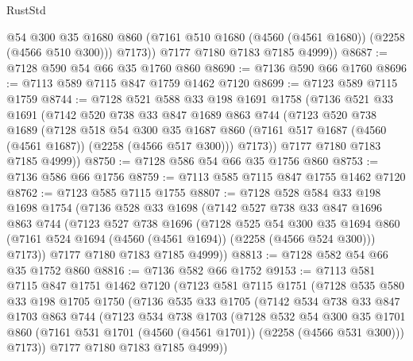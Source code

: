 \begin{lexlean}{RustStd}
\begin{coremodule}
            @54
            @300
            @35
            @1680
            @860
            (@7161 @510 @1680 (@4560 (@4561 @1680)) (@2258 (@4566 @510 @300)))
            @7173))
        @7177
        @7180
        @7183
        @7185
        @4999))
@8687 := @7128 @590 @54 @66 @35 @1760 @860
@8690 := @7136 @590 @66 @1760
@8696 := @7113 @589 @7115 @847 @1759 @1462 @7120
@8699 := @7123 @589 @7115 @1759
@8744 := @7128
    @521
    @588
    @33
    @198
    @1691
    @1758
    (@7136
      @521
      @33
      @1691
      (@7142
        @520
        @738
        @33
        @847
        @1689
        @863
        @744
        (@7123
          @520
          @738
          @1689
          (@7128
            @518
            @54
            @300
            @35
            @1687
            @860
            (@7161 @517 @1687 (@4560 (@4561 @1687)) (@2258 (@4566 @517 @300)))
            @7173))
        @7177
        @7180
        @7183
        @7185
        @4999))
@8750 := @7128 @586 @54 @66 @35 @1756 @860
@8753 := @7136 @586 @66 @1756
@8759 := @7113 @585 @7115 @847 @1755 @1462 @7120
@8762 := @7123 @585 @7115 @1755
@8807 := @7128
    @528
    @584
    @33
    @198
    @1698
    @1754
    (@7136
      @528
      @33
      @1698
      (@7142
        @527
        @738
        @33
        @847
        @1696
        @863
        @744
        (@7123
          @527
          @738
          @1696
          (@7128
            @525
            @54
            @300
            @35
            @1694
            @860
            (@7161 @524 @1694 (@4560 (@4561 @1694)) (@2258 (@4566 @524 @300)))
            @7173))
        @7177
        @7180
        @7183
        @7185
        @4999))
@8813 := @7128 @582 @54 @66 @35 @1752 @860
@8816 := @7136 @582 @66 @1752
@9153 := @7113
    @581
    @7115
    @847
    @1751
    @1462
    @7120
    (@7123
      @581
      @7115
      @1751
      (@7128
        @535
        @580
        @33
        @198
        @1705
        @1750
        (@7136
          @535
          @33
          @1705
          (@7142
            @534
            @738
            @33
            @847
            @1703
            @863
            @744
            (@7123
              @534
              @738
              @1703
              (@7128
                @532
                @54
                @300
                @35
                @1701
                @860
                (@7161 @531 @1701 (@4560 (@4561 @1701)) (@2258 (@4566 @531 @300)))
                @7173))
            @7177
            @7180
            @7183
            @7185
            @4999))

\end{coremodule}
\end{lexlean}
